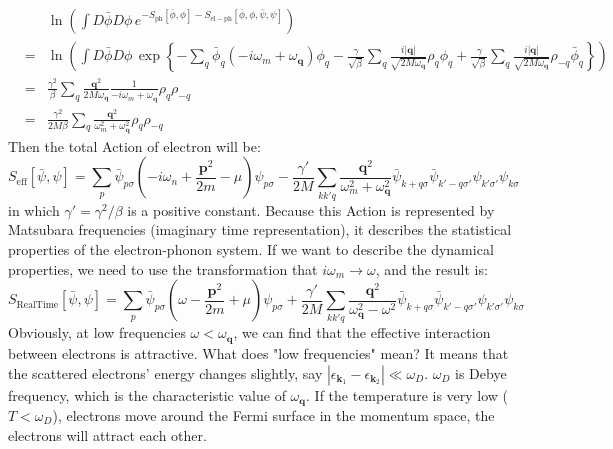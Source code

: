 \documentclass{article}
\newcommand{\mtp}{\mathbf{p}}
\newcommand{\mtq}{\mathbf{q}}
\newcommand{\mtk}{\mathbf{k}}
\begin{document}
\begin{eqnarray}
& & \ln\left(\int D\bar\phi D\phi\,e^{-S_{\mathrm{ph}}[\bar{\phi},\phi]-S_{\mathrm{el-ph}}[\bar{\phi},\phi,\bar{\psi},\psi]}\right)\nonumber\\
&=& \ln\left(\int D\bar\phi D\phi\, \exp\left\{- \sum_q \bar{\phi}_q(-i\omega_m+\omega_\mtq)\phi_q - \frac{\gamma}{\sqrt{\beta}}\sum_q \frac{i|\mtq|}{\sqrt{2M\omega_\mtq}}\rho_q\phi_q + \frac{\gamma}{\sqrt{\beta}}\sum_q \frac{i|\mtq|}{\sqrt{2M\omega_\mtq}}\rho_{-q}\bar{\phi}_q \right\}\right)\nonumber\\
&=&\frac{\gamma^2}{\beta} \sum_q \frac{\mtq^2}{2M\omega_\mtq}\frac{1}{-i\omega_m+ \omega_\mtq}\rho_q\rho_{-q}\nonumber\\
&=& \frac{\gamma^2}{2M\beta}\sum_q \frac{\mtq^2}{\omega_m^2 + \omega_\mtq^2}\rho_q\rho_{-q}
\end{eqnarray}
Then the total Action of electron will be:
\begin{equation}
S_{\mathrm{eff}}[\bar{\psi},\psi] = \sum_{p}\bar{\psi}_{p\sigma}\left(-i\omega_n +\frac{\mtp^2}{2m}-\mu\right)\psi_{p\sigma} - \frac{\gamma'}{2M}\sum_{kk'q} \frac{\mtq^2}{\omega_m^2 + \omega_\mtq^2} \bar{\psi}_{k+q\sigma}\bar{\psi}_{k'-q\sigma'}\psi_{k'\sigma'}\psi_{k\sigma}
\end{equation}
in which $\gamma' = \gamma^2/\beta$ is a positive constant.
Because this Action is represented by Matsubara frequencies (imaginary time representation), it describes the statistical properties of the electron-phonon system. If we want to describe the dynamical properties, we need to use the transformation that $i\omega_m \rightarrow \omega$, and the result is:
\begin{equation}
S_{\mathrm{Real Time}}[\bar{\psi},\psi] = \sum_{p}\bar{\psi}_{p\sigma}\left(\omega-\frac{\mtp^2}{2m}+\mu\right)\psi_{p\sigma} + \frac{\gamma'}{2M}\sum_{kk'q}\frac{\mtq^2}{\omega_\mtq^2-\omega^2} \bar{\psi}_{k+q\sigma}\bar{\psi}_{k'-q\sigma'}\psi_{k'\sigma'}\psi_{k\sigma}
\end{equation}
Obviously, at low frequencies $\omega < \omega_\mtq$, we can find that the effective interaction between electrons is attractive. What does "low frequencies" mean? It means that the scattered electrons' energy changes slightly, say $|\epsilon_{\mtk_1}-\epsilon_{\mtk_2}|\ll \omega_D$. $\omega_D$ is Debye frequency, which is the characteristic value of $\omega_\mtq$. If the temperature is very low ($T < \omega_D$), electrons move around the Fermi surface in the momentum space, the electrons will attract each other. 
\end{document}
